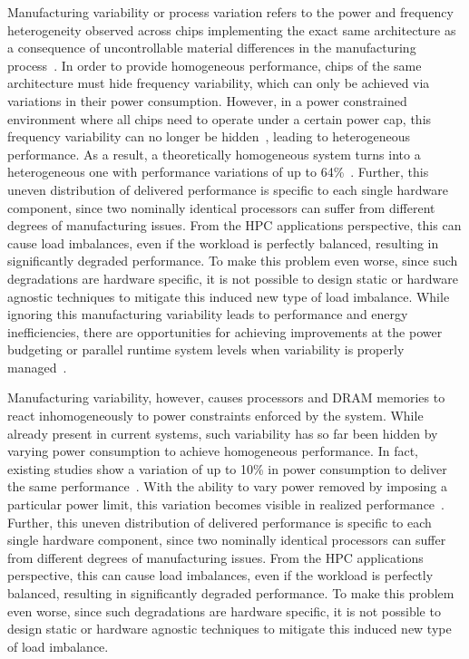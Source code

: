 Manufacturing variability or process variation refers to the
power and frequency heterogeneity observed across chips implementing the exact same architecture as a consequence of uncontrollable material differences in the manufacturing process~\cite{Rountree:2012:BDF:2357488.2357648}.
In order to provide homogeneous performance,
chips of the same architecture must hide frequency variability, which can only be achieved via variations in their power consumption.
However, in a power constrained environment where all chips need to operate under a certain power cap, this frequency variability can no longer be hidden~\cite{Rountree:2012:BDF:2357488.2357648}, leading to heterogeneous performance.
As a result, a theoretically homogeneous system turns into a heterogeneous one with performance variations of up to 64\%~\cite{Inadomi:2015:AMI:2807591.2807638}.  
Further, this
uneven distribution of delivered performance is specific to each single hardware component, since two nominally identical processors can suffer from different degrees of manufacturing issues.
From the HPC applications perspective, this can cause load imbalances, even if the workload is perfectly balanced, resulting in significantly degraded performance.
To make this problem even worse, since such degradations are hardware specific, it is not possible to design static or hardware agnostic techniques to mitigate this induced new type of load imbalance. 
While ignoring this manufacturing variability leads to performance 
and energy inefficiencies, 
there are opportunities for achieving improvements at the power budgeting or parallel runtime system levels when variability is properly managed~\cite{Teodorescu:2008:VAS:1381306.1382152,Inadomi:2015:AMI:2807591.2807638,Gholkar:2016:PTH:2967938.2967961,Totoni:tech:2014}.
\par
Manufacturing variability, however, causes  
processors and DRAM memories to react inhomogeneously to power constraints enforced by the system. While already present in current systems, such variability has so far been hidden by varying power consumption to achieve homogeneous performance. 
In fact, existing studies show 
a variation of up to 10\% in power consumption
to deliver the same performance~\cite{Rountree2012}. With the ability to vary power removed by imposing a particular power limit, this variation becomes visible in realized performance~\cite{Inadomi2015}.
Further, this
uneven distribution of delivered performance is specific to each single hardware component, since two nominally identical processors can suffer from different degrees of manufacturing issues.
From the HPC applications perspective, this can cause load imbalances, even if the workload is perfectly balanced, resulting in significantly degraded performance.
To make this problem even worse, since such degradations are hardware specific, it is not possible to design static or hardware agnostic techniques to mitigate this induced new type of load imbalance. 


